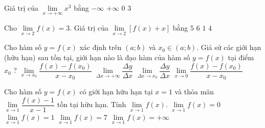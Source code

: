 

\begin{ex}%
	Giá trị của $\lim\limits_{x\to+\infty}x^3$  bằng
	\choice 
		 { $-\infty $}
		{\True $+\infty $} 
		 { $0$}
		{  $3$}
\end{ex}

\begin{ex}%
	Cho $\lim\limits_{x\to 2}f(x)=3$. Giá trị của $\lim\limits_{x \to  2}\left[f(x)+x\right]$ bằng
	 \choice
		 {\True $5$}
		 {$6$}
		 {$1$}
		 {$4$}
\end{ex}

\begin{ex}%
	Cho hàm số $y=f(x)$ xác định  trên $(a;b)$ và $x_0\in (a;b)$. Giả sử các giới hạn (hữu hạn) sau tồn tại, giới hạn nào là đạo hàm của hàm số $y=f(x)$ tại điểm $x_0$ ?
	\choice 
		{\True  $\lim\limits_{x\to x_0} \dfrac{f(x)-f(x_0)}{x-x_0}$}
		{$\lim\limits_{\Delta x\to +\infty} \dfrac{\Delta y}{\Delta  x}$}
		{$\lim\limits_{\Delta x\to x_0} \dfrac{\Delta y}{\Delta  x}$}
		{$\lim\limits_{x\to 0} \dfrac{f(x)-f(x_0)}{x-x_0}$} 
\end{ex}

\begin{ex}%
	Cho hàm số $y=f(x)$ có giới hạn hữu  hạn tại $x=1$ và thỏa mãn $\lim\limits_{x\to 1}\dfrac{f(x)-1}{x-1}$ tồn tại hữu hạn. Tính $\lim\limits_{x\to 1} f(x)$.
	\choice 
		{$\lim\limits_{x\to 1} f(x)=0$} 
		{\True  $\lim\limits_{x\to 1} f(x)=1$}
		{$\lim\limits_{x\to 1}  f(x)=7$}
		{$\lim\limits_{x\to  1} f(x)=+\infty$}
\end{ex}

